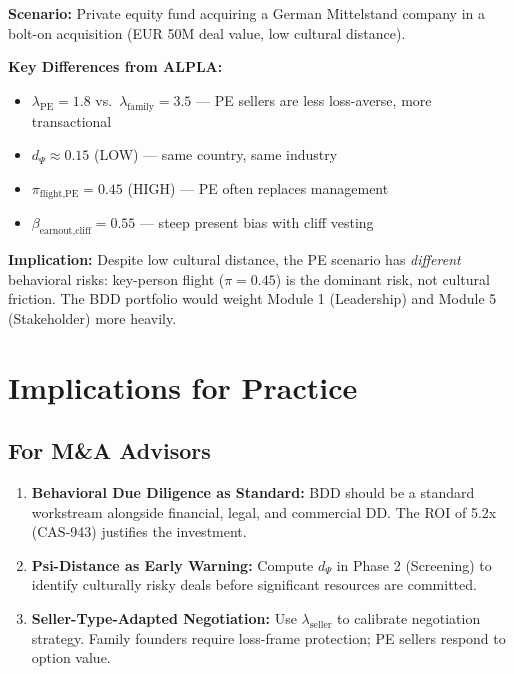 \begin{tcolorbox}[colback=green!5!white, colframe=green!75!black,
    title=Worked Example 2: PE Roll-Up (Contrasting Scenario)]

\textbf{Scenario:} Private equity fund acquiring a German Mittelstand company
in a bolt-on acquisition (EUR 50M deal value, low cultural distance).

\textbf{Key Differences from ALPLA:}
\begin{itemize}[nosep]
    \item $\lambda_{\text{PE}} = 1.8$ vs.\ $\lambda_{\text{family}} = 3.5$
          --- PE sellers are less loss-averse, more transactional
    \item $d_\Psi \approx 0.15$ (LOW) --- same country, same industry
    \item $\pi_{\text{flight,PE}} = 0.45$ (HIGH) --- PE often replaces management
    \item $\beta_{\text{earnout,cliff}} = 0.55$ --- steep present bias with cliff vesting
\end{itemize}

\textbf{Implication:} Despite low cultural distance, the PE scenario has
\emph{different} behavioral risks: key-person flight ($\pi = 0.45$) is the
dominant risk, not cultural friction. The BDD portfolio would weight Module 1
(Leadership) and Module 5 (Stakeholder) more heavily.

\end{tcolorbox}


\section{Implications for Practice}
\label{sec:ma-implications}

\subsection{For M\&A Advisors}

\begin{enumerate}
\item \textbf{Behavioral Due Diligence as Standard:} BDD should be a standard
      workstream alongside financial, legal, and commercial DD. The ROI of
      5.2x (CAS-943) justifies the investment.
\item \textbf{Psi-Distance as Early Warning:} Compute $d_\Psi$ in Phase 2
      (Screening) to identify culturally risky deals before significant
      resources are committed.
\item \textbf{Seller-Type-Adapted Negotiation:} Use $\lambda_{\text{seller}}$
      to calibrate negotiation strategy. Family founders require loss-frame
      protection; PE sellers respond to option value.
\end{enumerate}


